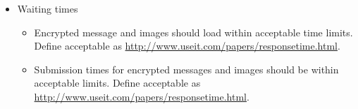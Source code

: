 \begin{itemize}
\begin{itemize}
            \item Waiting times
            \begin{itemize}
                \item Encrypted message and images should load within acceptable time limits. Define acceptable as \url{http://www.useit.com/papers/responsetime.html}.
                
                \item Submission times for encrypted messages and images should be within acceptable limits. Define acceptable as \url{http://www.useit.com/papers/responsetime.html}.
            \end{itemize}
            
        \end{itemize}
    
    \end{itemize}